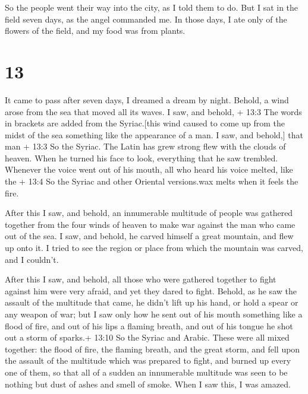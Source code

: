  So the people went their way into the city, as I told them
to do.  But I sat in the field seven days, as the angel
commanded me. In those days, I ate only of the flowers of the field, and
my food was from plants.

\hypertarget{section-12}{%
\section{13}\label{section-12}}

 It came to pass after seven days, I dreamed a dream by
night.  Behold, a wind arose from the sea that moved all its
waves.  I saw, and behold, + 13:3 The words in brackets are
added from the Syriac.{[}this wind caused to come up from the midst of
the sea something like the appearance of a man. I saw, and behold,{]}
that man + 13:3 So the Syriac. The Latin has grew strong flew with the
clouds of heaven. When he turned his face to look, everything that he
saw trembled.  Whenever the voice went out of his mouth, all
who heard his voice melted, like the + 13:4 So the Syriac and other
Oriental versions.wax melts when it feels the fire.

 After this I saw, and behold, an innumerable multitude of
people was gathered together from the four winds of heaven to make war
against the man who came out of the sea.  I saw, and behold,
he carved himself a great mountain, and flew up onto it.  I
tried to see the region or place from which the mountain was carved, and
I couldn't.

 After this I saw, and behold, all those who were gathered
together to fight against him were very afraid, and yet they dared to
fight.  Behold, as he saw the assault of the multitude that
came, he didn't lift up his hand, or hold a spear or any weapon of war;
 but I saw only how he sent out of his mouth something like
a flood of fire, and out of his lips a flaming breath, and out of his
tongue he shot out a storm of sparks.+ 13:10 So the Syriac and Arabic.
 These were all mixed together: the flood of fire, the
flaming breath, and the great storm, and fell upon the assault of the
multitude which was prepared to fight, and burned up every one of them,
so that all of a sudden an innumerable multitude was seen to be nothing
but dust of ashes and smell of smoke. When I saw this, I was amazed.

